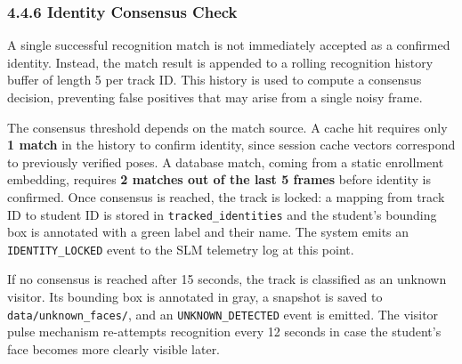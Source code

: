 \documentclass{report}
\begin{document}
\subsubsection*{4.4.6 Identity Consensus Check}
\normalsize{
A single successful recognition match is not immediately accepted as a confirmed identity. Instead,\vspace{3pt} the match result is appended to a rolling recognition history buffer of length 5 per track ID. This\vspace{3pt} history is used to compute a consensus decision, preventing false positives that may arise from a\vspace{3pt} single noisy frame.

The consensus threshold depends on the match source. A cache hit requires only \textbf{1 match} in\vspace{3pt} the history to confirm identity, since session cache vectors correspond to previously verified poses.\vspace{3pt} A database match, coming from a static enrollment embedding, requires \textbf{2 matches out of the last\vspace{3pt} 5 frames} before identity is confirmed. Once consensus is reached, the track is locked: a mapping\vspace{3pt} from track ID to student ID is stored in \texttt{tracked\_identities} and the student's bounding box is\vspace{3pt} annotated with a green label and their name. The system emits an \texttt{IDENTITY\_LOCKED} event to\vspace{3pt} the SLM telemetry log at this point.

If no consensus is reached after 15 seconds, the track is classified as an unknown visitor. Its\vspace{3pt} bounding box is annotated in gray, a snapshot is saved to \texttt{data/unknown\_faces/}, and an\vspace{3pt} \texttt{UNKNOWN\_DETECTED} event is emitted. The visitor pulse mechanism re-attempts recognition every\vspace{3pt} 12 seconds in case the student's face becomes more clearly visible later.
}
\end{document}
